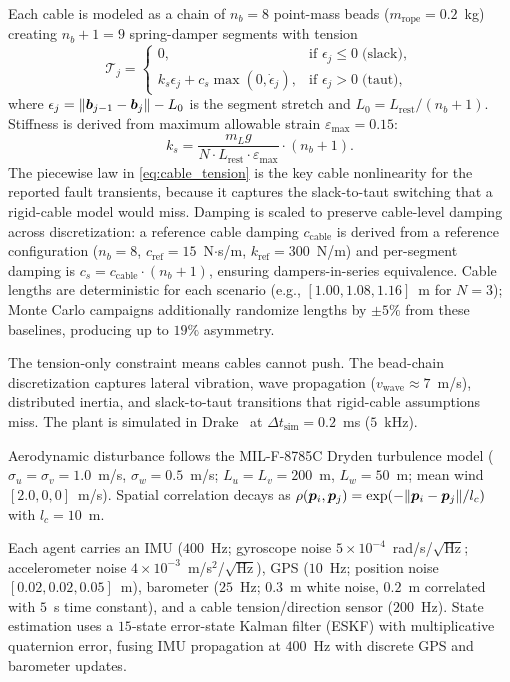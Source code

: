 Each cable is modeled as a chain of $n_b = 8$ point-mass beads ($m_{\mathrm{rope}} = 0.2$~kg) creating $n_b + 1 = 9$ spring-damper segments with tension
\begin{equation}\label{eq:cable_tension}
  \mathcal{T}_j = \begin{cases}
    0, & \text{if } \epsilon_j \leq 0 \;\text{(slack)}, \\
    k_s \epsilon_j + c_s \max(0, \dot{\epsilon}_j), & \text{if } \epsilon_j > 0 \;\text{(taut)},
  \end{cases}
\end{equation}
where $\epsilon_j = \lVert \bm{b}_{j-1} - \bm{b}_j \rVert - L_0$ is the segment stretch and $L_0 = L_{\mathrm{rest}}/(n_b + 1)$. Stiffness is derived from maximum allowable strain $\varepsilon_{\max} = 0.15$:
\begin{equation}\label{eq:cable_stiffness}
  k_s = \frac{m_L g}{N \cdot L_{\mathrm{rest}} \cdot \varepsilon_{\max}} \cdot (n_b + 1).
\end{equation}
The piecewise law in \eqref{eq:cable_tension} is the key cable nonlinearity for the reported fault transients, because it captures the slack-to-taut switching that a rigid-cable model would miss.
Damping is scaled to preserve cable-level damping across discretization: a reference cable damping $c_{\mathrm{cable}}$ is derived from a reference configuration ($n_b{=}8$, $c_{\mathrm{ref}} = 15$~N$\cdot$s/m, $k_{\mathrm{ref}} = 300$~N/m) and per-segment damping is $c_s = c_{\mathrm{cable}} \cdot (n_b{+}1)$, ensuring dampers-in-series equivalence. Cable lengths are deterministic for each scenario (e.g., $[1.00, 1.08, 1.16]$~m for $N{=}3$); Monte Carlo campaigns additionally randomize lengths by ${\pm}5\%$ from these baselines, producing up to $19\%$ asymmetry.

The tension-only constraint means cables cannot push. The bead-chain discretization captures lateral vibration, wave propagation ($v_{\mathrm{wave}} \approx 7$~m/s), distributed inertia, and slack-to-taut transitions that rigid-cable assumptions miss. The plant is simulated in Drake~\cite{drake2024} at $\Delta t_{\mathrm{sim}} = 0.2$~ms ($5$~kHz).

Aerodynamic disturbance follows the MIL-F-8785C Dryden turbulence model ($\sigma_u = \sigma_v = 1.0$~m/s, $\sigma_w = 0.5$~m/s; $L_u = L_v = 200$~m, $L_w = 50$~m; mean wind $[2.0, 0, 0]$~m/s). Spatial correlation decays as $\rho(\bm{p}_i, \bm{p}_j) = \exp(-\lVert \bm{p}_i - \bm{p}_j \rVert/l_c)$ with $l_c = 10$~m.

Each agent carries an IMU ($400$~Hz; gyroscope noise $5 \times 10^{-4}$~rad/s/$\sqrt{\text{Hz}}$; accelerometer noise $4 \times 10^{-3}$~m/s$^2$/$\sqrt{\text{Hz}}$), GPS ($10$~Hz; position noise $[0.02, 0.02, 0.05]$~m), barometer ($25$~Hz; $0.3$~m white noise, $0.2$~m correlated with $5$~s time constant), and a cable tension/direction sensor ($200$~Hz). State estimation uses a $15$-state error-state Kalman filter (ESKF) with multiplicative quaternion error, fusing IMU propagation at $400$~Hz with discrete GPS and barometer updates.

